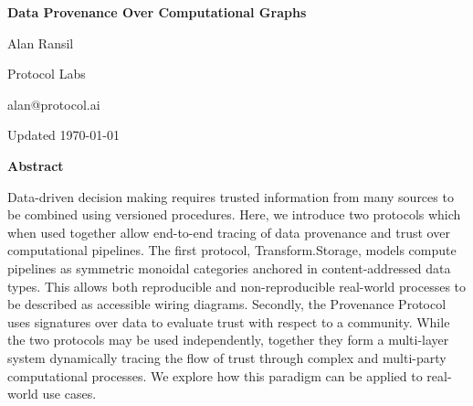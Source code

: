 \documentclass[9pt, oneside]{article}   	%
\begin{document}
\newpage


\begin{center}
\Large{\textbf{Data Provenance Over Computational Graphs}}
\vspace{1 cm}

\normalsize{}
Alan Ransil

Protocol Labs

alan@protocol.ai

\vspace{1 cm}
Updated \today

\vspace{1 cm}
\Large{\textbf{Abstract}}

\end{center}

\noindent Data-driven decision making requires trusted information from many sources to be combined using versioned procedures. Here, we introduce two protocols which when used together allow end-to-end tracing of data provenance and trust over computational pipelines. The first protocol, Transform.Storage, models compute pipelines as symmetric monoidal categories anchored in content-addressed data types. This allows both reproducible and non-reproducible real-world processes to be described as accessible wiring diagrams. Secondly, the Provenance Protocol uses signatures over data to evaluate trust with respect to a community.  While the two protocols may be used independently, together they form a multi-layer system dynamically tracing the flow of trust through complex and multi-party computational processes. We explore how this paradigm can  be applied to real-world use cases.
\end{document}
